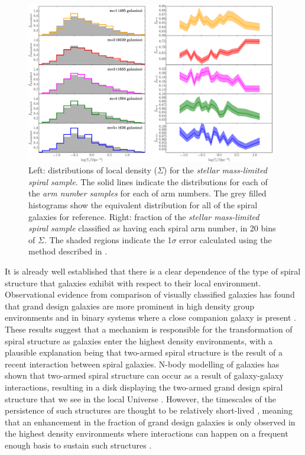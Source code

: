 \documentclass[useAMS,usenatbib]{mn2e}
\begin{document}
\begin{figure}
		\centering

        \includegraphics[width=0.975\textwidth]{Images/Results/density_plots.pdf}

        \caption{Left: distributions of local density ($\Sigma$) for the \textit{stellar mass-limited spiral sample}. The solid lines indicate the distributions for each of the \textit{arm number samples} for each of arm numbers. The grey filled histograms show the equivalent distribution for all of the spiral galaxies for reference. Right: fraction of the \textit{stellar mass-limited spiral sample} classified as having each spiral arm number, in 20 bins of $\Sigma$. The shaded regions indicate the 1$\sigma$ error calculated using the method described in \citet{Cameron_11}.}

        \label{fig:density_plots}

\end{figure}

It is already well established that there is a clear dependence of the type of spiral structure that galaxies exhibit with respect to their local environment. Observational evidence from comparison of visually classified galaxies has found that grand design galaxies are more prominent in high density group environments \citep{EE_82,EE_87,Ann_14} and in binary systems where a close companion galaxy is present \citep{EE_82,Ann_14}. These results suggest that a mechanism is responsible for the transformation of spiral structure as galaxies enter the highest density environments, with a plausible explanation being that two-armed spiral structure is the result of a recent interaction between spiral galaxies. N-body modelling of galaxies has shown that two-armed spiral structure can occur as a result of galaxy-galaxy interactions, resulting in a disk displaying the two-armed grand design spiral structure that we see in the local Universe \citep{Sundelius_87,Dobbs_10}. However, the timescales of the persistence of such structures are thought to be relatively short-lived \citep{Oh_08,Dobbs_10}, meaning that an enhancement in the fraction of grand design galaxies is only observed in the highest density environments where interactions can happen on a frequent enough basis to sustain such structures \citep{EE_86}.
\end{document}
